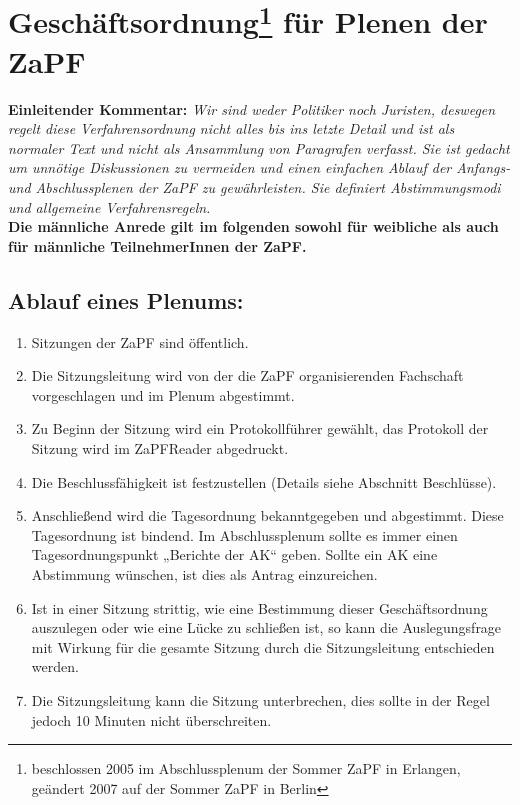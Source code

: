 



\chapter*{Geschäftsordnung\footnote{beschlossen 2005 im Abschlussplenum der Sommer ZaPF in Erlangen,\\ geändert 2007 auf der Sommer ZaPF in Berlin } für Plenen der ZaPF}

\textbf{Einleitender Kommentar:}
{\footnotesize\textit{
Wir sind weder Politiker noch Juristen, deswegen regelt diese Verfahrensordnung nicht alles bis ins
letzte Detail und ist als normaler Text und nicht als Ansammlung von Paragrafen verfasst. Sie ist
gedacht um unnötige Diskussionen zu vermeiden und einen einfachen Ablauf der Anfangs- und
Abschlussplenen der ZaPF zu gewährleisten. Sie definiert Abstimmungsmodi und allgemeine
Verfahrensregeln.}}\\[1ex]
\noindent \textbf{Die männliche Anrede gilt im folgenden sowohl für
weibliche als auch für männliche
 TeilnehmerInnen der ZaPF.}

\section*{Ablauf eines Plenums:}
\begin{enumerate}

\item{Sitzungen der ZaPF sind öffentlich.}

\item{Die Sitzungsleitung wird von der die ZaPF organisierenden Fachschaft vorgeschlagen und im
Plenum abgestimmt.}

\item{Zu Beginn der Sitzung wird ein Protokollführer gewählt, das Protokoll der Sitzung wird im ZaPFReader
abgedruckt.}

\item{Die Beschlussfähigkeit ist festzustellen (Details siehe Abschnitt Beschlüsse).}

\item{Anschließend wird die Tagesordnung bekanntgegeben und abgestimmt. Diese Tagesordnung ist
bindend. Im Abschlussplenum sollte es immer einen Tagesordnungspunkt „Berichte der AK“ geben.
Sollte ein AK eine Abstimmung wünschen, ist dies als Antrag einzureichen.}

\item{ Ist in einer Sitzung strittig, wie eine Bestimmung dieser Geschäftsordnung auszulegen oder wie eine
Lücke zu schließen ist, so kann die Auslegungsfrage mit Wirkung für die gesamte Sitzung durch die
Sitzungsleitung entschieden werden.}

\item{Die Sitzungsleitung kann die Sitzung unterbrechen, dies sollte in der Regel jedoch 10 Minuten nicht
überschreiten.}
\end{enumerate}

